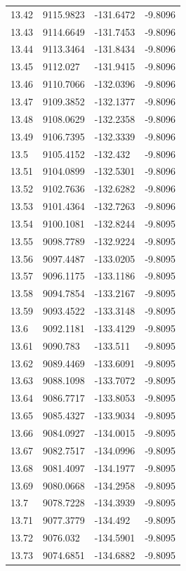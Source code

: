 \begin{table}[H]
\begin{tabular}{llll}
13.42 & 9115.9823 & -131.6472 & -9.8096 \\
13.43 & 9114.6649 & -131.7453 & -9.8096 \\
13.44 & 9113.3464 & -131.8434 & -9.8096 \\
13.45 & 9112.027 & -131.9415 & -9.8096 \\
13.46 & 9110.7066 & -132.0396 & -9.8096 \\
13.47 & 9109.3852 & -132.1377 & -9.8096 \\
13.48 & 9108.0629 & -132.2358 & -9.8096 \\
13.49 & 9106.7395 & -132.3339 & -9.8096 \\
13.5 & 9105.4152 & -132.432 & -9.8096 \\
13.51 & 9104.0899 & -132.5301 & -9.8096 \\
13.52 & 9102.7636 & -132.6282 & -9.8096 \\
13.53 & 9101.4364 & -132.7263 & -9.8096 \\
13.54 & 9100.1081 & -132.8244 & -9.8095 \\
13.55 & 9098.7789 & -132.9224 & -9.8095 \\
13.56 & 9097.4487 & -133.0205 & -9.8095 \\
13.57 & 9096.1175 & -133.1186 & -9.8095 \\
13.58 & 9094.7854 & -133.2167 & -9.8095 \\
13.59 & 9093.4522 & -133.3148 & -9.8095 \\
13.6 & 9092.1181 & -133.4129 & -9.8095 \\
13.61 & 9090.783 & -133.511 & -9.8095 \\
13.62 & 9089.4469 & -133.6091 & -9.8095 \\
13.63 & 9088.1098 & -133.7072 & -9.8095 \\
13.64 & 9086.7717 & -133.8053 & -9.8095 \\
13.65 & 9085.4327 & -133.9034 & -9.8095 \\
13.66 & 9084.0927 & -134.0015 & -9.8095 \\
13.67 & 9082.7517 & -134.0996 & -9.8095 \\
13.68 & 9081.4097 & -134.1977 & -9.8095 \\
13.69 & 9080.0668 & -134.2958 & -9.8095 \\
13.7 & 9078.7228 & -134.3939 & -9.8095 \\
13.71 & 9077.3779 & -134.492 & -9.8095 \\
13.72 & 9076.032 & -134.5901 & -9.8095 \\
13.73 & 9074.6851 & -134.6882 & -9.8095 \\

\end{tabular}
\end{table}
